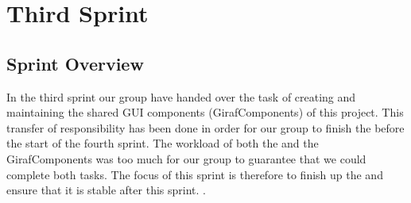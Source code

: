 \part{Third Sprint}
\label{par:third_sprint}

\chapter{Sprint Overview}
In the third sprint our group have handed over the task of creating and maintaining the shared GUI components (GirafComponents) of this project. This transfer of responsibility has been done in order for our group to finish the \ct before the start of the fourth sprint. The workload of both the \ct and the GirafComponents was too much for our group to guarantee that we could complete both tasks. The focus of this sprint is therefore to finish up the \ct and ensure that it is stable after this sprint.
.




